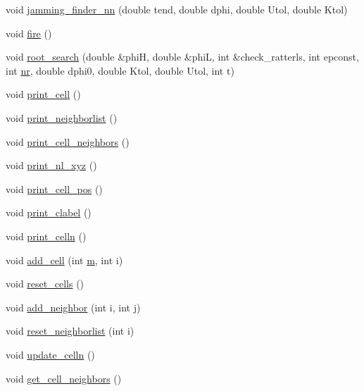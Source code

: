 \begin{DoxyCompactItemize}
\item 
void \mbox{\hyperlink{classpacking_a09872b70b71323f159a3490073aa1741}{jamming\+\_\+finder\+\_\+nn}} (double tend, double dphi, double Utol, double Ktol)
\item 
void \mbox{\hyperlink{classpacking_af0edc401a0cb530600f0219e24518f23}{fire}} ()
\item 
void \mbox{\hyperlink{classpacking_a7560d84cdb496db31c6314c3a82b10e0}{root\+\_\+search}} (double \&phiH, double \&phiL, int \&check\+\_\+ratterls, int epconst, int \mbox{\hyperlink{classpacking_a31eede3d604c45fef6021170ee506c77}{nr}}, double dphi0, double Ktol, double Utol, int t)
\item 
void \mbox{\hyperlink{classpacking_af52187be2ba3d6cc25189c7cd389ba18}{print\+\_\+cell}} ()
\item 
void \mbox{\hyperlink{classpacking_aec21a0ddfaaa3153f016ee91901b0197}{print\+\_\+neighborlist}} ()
\item 
void \mbox{\hyperlink{classpacking_a6f594a2ebfaaf03a8a43f31d5e170b86}{print\+\_\+cell\+\_\+neighbors}} ()
\item 
void \mbox{\hyperlink{classpacking_a2b2c2908beb3d2577c01d4db73e7e2c1}{print\+\_\+nl\+\_\+xyz}} ()
\item 
void \mbox{\hyperlink{classpacking_a1dfafb1273eef9839012796f8f674cd3}{print\+\_\+cell\+\_\+pos}} ()
\item 
void \mbox{\hyperlink{classpacking_ac064578aca74b4916463599a9fbdf2af}{print\+\_\+clabel}} ()
\item 
void \mbox{\hyperlink{classpacking_a874b2bf73b23b4e051c293f68e25e6c9}{print\+\_\+celln}} ()
\item 
void \mbox{\hyperlink{classpacking_a433ee4f918ce8124cc4dc24a29dcbe1c}{add\+\_\+cell}} (int \mbox{\hyperlink{classpacking_ab06bef3feef42f5c48c39fa1ae297e23}{m}}, int i)
\item 
void \mbox{\hyperlink{classpacking_a7f866169806cadb74aaed38e246d11e5}{reset\+\_\+cells}} ()
\item 
void \mbox{\hyperlink{classpacking_a9a47d7d55eb9fa7a4083571fc2a9b78f}{add\+\_\+neighbor}} (int i, int j)
\item 
void \mbox{\hyperlink{classpacking_a9c073e15bbafc308692fb63f6390a843}{reset\+\_\+neighborlist}} (int i)
\item 
void \mbox{\hyperlink{classpacking_ac55b5f684a8767d536c671f23eea808e}{update\+\_\+celln}} ()
\item 
void \mbox{\hyperlink{classpacking_a51875315e1e8c16a5dfc9e3807fcff17}{get\+\_\+cell\+\_\+neighbors}} ()

\end{DoxyCompactItemize}
